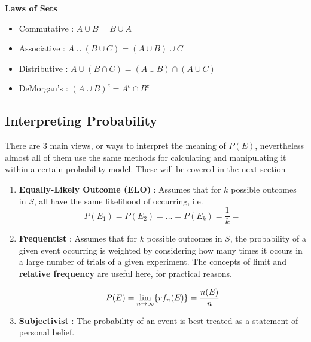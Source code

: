 		\textbf{Laws of Sets} 
		\begin{itemize}
		\item[] Commutative : $A \cup B = B \cup A $
		\item[] Associative : $ A \cup (B \cup C) = (A \cup B) \cup C$
		\item[] Distributive : $ A \cup (B \cap C) = (A \cup B) \cap (A \cup C)$
		\item[] DeMorgan's : $(A \cup B)^{c} = A^{c} \cap B^{c}$
		\end{itemize}

	\subsection{Interpreting Probability}\label{sec:1}


		\par{There are 3 main views, or ways to interpret the meaning of $P(E)$, nevertheless almost all of them use the same methods for calculating and manipulating it within a certain probability model. These will be covered in the next section}

		\begin{enumerate}
		\item \textbf{Equally-Likely Outcome (ELO)} : Assumes that for $k$ possible outcomes in $S$, all have the same likelihood of occurring, i.e. $$ P(E_{1}) = P(E_{2}) = \dots = P(E_{k}) = \frac{1}{k} =  $$

		\item \textbf{Frequentist} : Assumes that for $k$ possible outcomes in $S$, the probability of a given event occurring is weighted by considering how many times it occurs in a large number of trials of a given experiment. The concepts of limit and \textbf{relative frequency} are useful here, for practical reasons.

		$$ P(E) = \lim_{n \to \infty}\{rf_{n}(E)\} = \frac{n(E)}{n} $$ 

		\item \textbf{Subjectivist} : The probability of an event is best treated as a statement of personal belief.

		\end{enumerate}

\newpage

